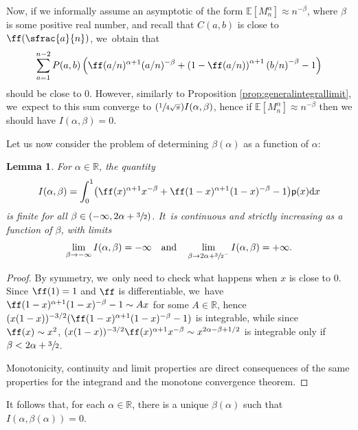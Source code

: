 \documentclass[JEP,XML,SOM,Unicode,NoFloatCountersInSection, NoEqCountersInSection,published]{cedram}
\newcommand{\Psfrac}[2]{(\sfrac{#1}{#2})}
\newcommand{\pp}{\mathsf{p}}
\newcommand{\E}{\mathbb{E}}
\newcommand{\R}{{\mathbb{R}}}
\newcommand{\dd}{\mathrm{d}}
\newtheorem{lem}[thm]{Lemma}
\theoremstyle{definition}
\begin{document}
Now, if we informally assume an asymptotic of the form $\E[M_n^\alpha] \approx n^{-\beta}$, where $\beta$ is some positive real number, and recall that $C(a,b)$ is close to $\ff(\sfrac{a}{n})$, we~obtain that
\[
\sum_{a=1}^{n-2}P(a,b)\left(\ff(a/n)^{\alpha+1} (a/n)^{-\beta}+\left(1-\ff(a/n)\right)^{\alpha+1} \left(b/n\right)^{-\beta}-1\right)
\]
should be close to $0$. However, similarly to Proposition \ref{prop:generalintegrallimit}, we~expect to this sum converge to $\Psfrac{1}{4\sqrt{\pi}} I(\alpha,\beta)$, hence if $\E[M_n^\alpha] \approx n^{-\beta}$ then we should have $I(\alpha,\beta)=0$.

Let us now consider the problem of determining $\beta(\alpha)$ as a function of $\alpha$:
\begin{lem}
For $\alpha\in\R$, the quantity\vspace*{-3pt}
\[
I(\alpha,\beta)=\int_0^1 \bigl(\ff(x)^{\alpha+1} x^{-\beta}+\ff(1-x)^{\alpha+1} (1-x)^{-\beta}-1\bigr)\pp(x)\dd x
\]
is finite for all $\beta \in (-\infty,2\alpha+\sfrac{3}{2})$. It~is continuous and strictly increasing as a function of $\beta$, with limits\vspace*{-3pt}
\[
\lim_{\beta\to -\infty}I(\alpha,\beta)=-\infty\quad\text{and}\quad\lim_{\beta\to2\alpha+\sfrac{3}{2}^-}I(\alpha,\beta)=+\infty.
\]
\end{lem}

\begin{proof}
By symmetry, we~only need to check what happens when $x$ is close to $0$. Since $\ff(1)=1$ and $\ff$ is differentiable, we~have $\ff(1-x)^{\alpha+1} (1-x)^{-\beta}-1 \sim Ax$ for some $A\in\R$, hence $(x(1-x))^{-3/2}(\ff(1-x)^{\alpha+1} (1-x)^{-\beta}-1)$ is integrable, while since $\ff(x)\sim x^2$, $(x(1-x))^{-3/2}\ff(x)^{\alpha+1}x^{-\beta}\sim x^{2\alpha-\beta+1/2}$ is integrable only if $\beta<2\alpha+\sfrac{3}{2}$.

Monotonicity, continuity and limit properties are direct consequences of the same properties for the integrand and the monotone convergence theorem.
\end{proof}

It follows that, for each $\alpha\in\R$, there is a unique $\beta(\alpha)$ such that $I(\alpha,\beta(\alpha))=0$.
\end{document}
